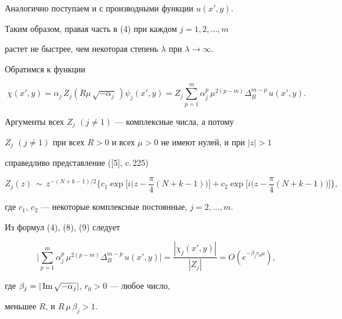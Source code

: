 Аналогично поступаем и с производными функции $u(x',y).$





Таким образом, правая часть в (4) при каждом $j=1,2,\dotsc,m$


растет не быстрее, чем некоторая степень $\lambda$ при $\lambda\to\infty.$





Обратимся к функции


\begin{equation}


\chi(x',y)=\alpha_j\,Z_j(R\mu\,\sqrt{-\alpha_j}\,)\psi_j(x',y)=


Z_j\sum_{p=1}^m \alpha_j^p\,\mu^{2(p-m)}\Delta_B^{m-p}\,u(x',y).


\end{equation}


Аргументы всех $Z_j$ $(j\ne 1)$ --- комплексные числа, а потому


$Z_j$ $(j\ne 1)$ при всех $R>0$ и всех $\mu>0$ не имеют нулей, и при $|z|>1$


справедливо представление ([5], c.\,225)


\begin{equation}


Z_j(z)\,\sim\, z^{-(N+k-1)/2}


\biggl\{c_1\exp\biggl[i\biggl(z-\frac{\pi}{4}


(N+k-1)\biggr)\biggr]+


c_2\exp\biggl[i\biggl(z-\frac{\pi}{4}


(N+k-1)\biggr)\biggr]\biggr\},


\end{equation}


где $c_1$, $c_2$ --- некоторые комплексные постоянные, $j=2,\dotsc,m$.


Из формул (4), (8), (9) следует


\begin{equation}


\biggl|\sum_{p=1}^m\alpha^p_j\,\mu^{2(p-m)}


\Delta^{m-p}_B\,u(x',y)\biggr|=


\frac{|\chi_j(x',y)|}{|Z_j|}=O\left(e^{-\beta_jr_0\mu}\right),


\end{equation}


где $\beta_j=|\operatorname{Im} \sqrt{-\alpha_j}|$, $r_0{>}0$ --- любое число,


меньшее $R$, и $R\,\mu\,\beta_j{>}1.$





